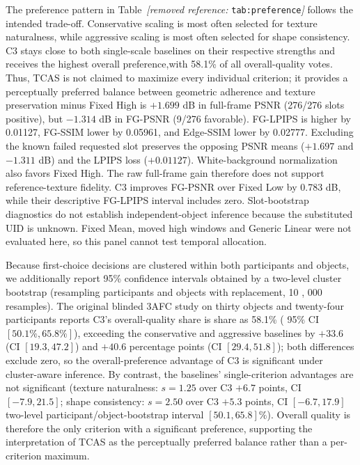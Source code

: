 \documentclass[times,twocolumn,final]{elsarticle}
\providecommand{\DIFadd}[1]{{\protect\color{blue} \sf #1}} %
\providecommand{\DIFdel}[1]{{\protect\color{red} \scriptsize #1}} %
\providecommand{\DIFaddbegin}{} %
\providecommand{\DIFaddend}{} %
\providecommand{\DIFdelbegin}{} %
\providecommand{\DIFdelend}{} %
\begin{document}
\DIFdelbegin \DIFdel{The preference pattern in Table~\textit{[removed reference: }\texttt{tab:preference}\textit{]} follows the intended trade-off. Conservative scaling is most often selected for texture naturalness, while aggressive scaling is most often selected for shape consistency.
}\DIFdelend C3 \DIFdelbegin \DIFdel{stays close to both single-scale baselines on their respective strengths and receives the highest overall preference,with 58.1\% of all overall-quality votes. Thus, TCAS is not claimed to maximize every individual criterion; it provides a perceptually preferred balance between geometric adherence and texture preservation}\DIFdelend \DIFaddbegin \DIFadd{minus Fixed High is $+1.699$ dB in full-frame PSNR (276/276 slots positive), but $-1.314$ dB in FG-PSNR (9/276 favorable). FG-LPIPS is higher by 0.01127, FG-SSIM lower by 0.05961, and Edge-SSIM lower by 0.02777. Excluding the known failed requested slot preserves the opposing PSNR means ($+1.697$ and $-1.311$ dB) and the LPIPS loss ($+0.01127$)}\DIFaddend . \DIFaddbegin \DIFadd{White-background normalization also favors Fixed High. The raw full-frame gain therefore does not support reference-texture fidelity. C3 improves FG-PSNR over Fixed Low by 0.783 dB, while their descriptive FG-LPIPS interval includes zero. Slot-bootstrap diagnostics do not establish independent-object inference because the substituted UID is unknown. Fixed Mean, moved high windows and Generic Linear were not evaluated here, so this panel cannot test temporal allocation.
}\DIFaddend 

\DIFdelbegin \DIFdel{Because first-choice decisions are clustered within both participants and objects, we additionally report 95\% confidence intervals obtained by a two-level cluster bootstrap (resampling participants and objects with replacement, 10}%
\DIFdel{, }%
\DIFdel{000 resamples). }\DIFdelend \DIFaddbegin \DIFadd{The original blinded 3AFC study on thirty objects and twenty-four participants reports }\DIFaddend C3's overall-quality \DIFdelbegin \DIFdel{share is }\DIFdelend \DIFaddbegin \DIFadd{share as }\DIFaddend 58.1\% (\DIFdelbegin \DIFdel{95\% CI $[50.1\%, 65.8\%]$), exceeding the conservative and aggressive baselines by $+33.6$ (CI $[19.3, 47.2]$) and $+40.6$ percentage points (CI $[29.4, 51.8]$); both differences exclude zero, so the overall-preference advantage of C3 is significant under cluster-aware inference. By contrast, the baselines' single-criterion advantages are not significant (texture naturalness: $s = 1.25$ over C3 $+6.7$ points, CI $[-7.9, 21.5]$; shape consistency: $s = 2.50$ over C3 $+5.3$ points, CI $[-6.7, 17.9]$}\DIFdelend \DIFaddbegin \DIFadd{two-level participant/object-bootstrap interval $[50.1,65.8]\%$}\DIFaddend ). \DIFdelbegin \DIFdel{Overall quality is therefore the only criterion with a significant preference, supporting the interpretation of TCAS as the perceptually preferred balance rather than a per-criterion maximum. }%
\end{document}
